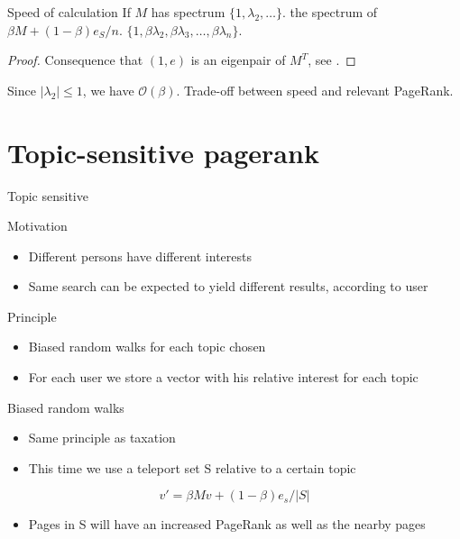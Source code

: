 \documentclass[10pt]{beamer}
\newcommand\bigoh{\mathcal{O}}
\begin{document}
\begin{frame}
  \begin{block}{Speed of calculation \cite[p.~12]{langville2004deeper}}
    If $M$ has spectrum $\{1,\lambda_2,\ldots\}$.
    the spectrum of $\beta M + (1-\beta)e_S/n$.
    $\{1,\beta\lambda_2,\beta\lambda_3,\ldots,\beta\lambda_n\}$.
    \begin{proof}
      Consequence that $(1,e)$ is an eigenpair of $M^T$,
      see \cite[p.~12]{langville2004deeper}.
    \end{proof}
  \end{block}
  Since $|\lambda_2| \leq 1$, we have $\bigoh(\beta)$.
  Trade-off between speed and relevant PageRank.
\end{frame}
\section{Topic-sensitive pagerank}
\begin{frame}
  \tableofcontents[currentsection]
\end{frame}
\begin{frame}[allowframebreaks]{Topic sensitive}
  \begin{block}{Motivation}
  \begin{itemize}
  \item Different persons have different interests
  \item Same search can be expected to yield different results, according to user
  \end{itemize}
  \end{block}
  \begin{block}{Principle}
  \begin{itemize}
  \item Biased random walks for each topic chosen
  \item For each user we store a vector with his relative interest for each topic
  \end{itemize}
  \end{block}
  \framebreak
  \begin{block}{Biased random walks}
    \begin{itemize}
      \item Same principle as taxation
      \item This time we use a teleport set S relative to a certain topic
    \end{itemize}
    $$ v' = \beta Mv + (1-\beta)e_s/|S|$$
    \begin{itemize}
    \item Pages in S will have an increased PageRank as well as the nearby pages
    \end{itemize}
  \end{block}
\end{frame}
\end{document}
